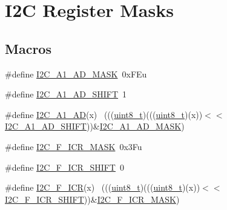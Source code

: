 \hypertarget{group___i2_c___register___masks}{}\section{I2C Register Masks}
\label{group___i2_c___register___masks}
\subsection*{Macros}
\begin{DoxyCompactItemize}
\item 
\#define \hyperlink{group___i2_c___register___masks_gad90fbd42f33b89ff3296c52700771b1b}{I2\+C\+\_\+\+A1\+\_\+\+A\+D\+\_\+\+M\+A\+SK}~0x\+F\+Eu
\item 
\#define \hyperlink{group___i2_c___register___masks_gaf074658893634b95a9858ee29bbdd88a}{I2\+C\+\_\+\+A1\+\_\+\+A\+D\+\_\+\+S\+H\+I\+FT}~1
\item 
\#define \hyperlink{group___i2_c___register___masks_ga546cc5fdf8c77c06ffefcdf0a69c1f65}{I2\+C\+\_\+\+A1\+\_\+\+AD}(x)                                                      ~(((\hyperlink{_p_e___types_8h_aba7bc1797add20fe3efdf37ced1182c5}{uint8\+\_\+t})(((\hyperlink{_p_e___types_8h_aba7bc1797add20fe3efdf37ced1182c5}{uint8\+\_\+t})(x))$<$$<$\hyperlink{group___i2_c___register___masks_gaf074658893634b95a9858ee29bbdd88a}{I2\+C\+\_\+\+A1\+\_\+\+A\+D\+\_\+\+S\+H\+I\+FT}))\&\hyperlink{group___i2_c___register___masks_gad90fbd42f33b89ff3296c52700771b1b}{I2\+C\+\_\+\+A1\+\_\+\+A\+D\+\_\+\+M\+A\+SK})
\item 
\#define \hyperlink{group___i2_c___register___masks_gaeb777a93b5695409902fb2f2b77eb760}{I2\+C\+\_\+\+F\+\_\+\+I\+C\+R\+\_\+\+M\+A\+SK}~0x3\+Fu
\item 
\#define \hyperlink{group___i2_c___register___masks_ga8e2daf0de75e77e33467f6b132be0c30}{I2\+C\+\_\+\+F\+\_\+\+I\+C\+R\+\_\+\+S\+H\+I\+FT}~0
\item 
\#define \hyperlink{group___i2_c___register___masks_gafc6c8fefa2930785f203c98adee6f089}{I2\+C\+\_\+\+F\+\_\+\+I\+CR}(x)                                                      ~(((\hyperlink{_p_e___types_8h_aba7bc1797add20fe3efdf37ced1182c5}{uint8\+\_\+t})(((\hyperlink{_p_e___types_8h_aba7bc1797add20fe3efdf37ced1182c5}{uint8\+\_\+t})(x))$<$$<$\hyperlink{group___i2_c___register___masks_ga8e2daf0de75e77e33467f6b132be0c30}{I2\+C\+\_\+\+F\+\_\+\+I\+C\+R\+\_\+\+S\+H\+I\+FT}))\&\hyperlink{group___i2_c___register___masks_gaeb777a93b5695409902fb2f2b77eb760}{I2\+C\+\_\+\+F\+\_\+\+I\+C\+R\+\_\+\+M\+A\+SK})

\end{DoxyCompactItemize}
